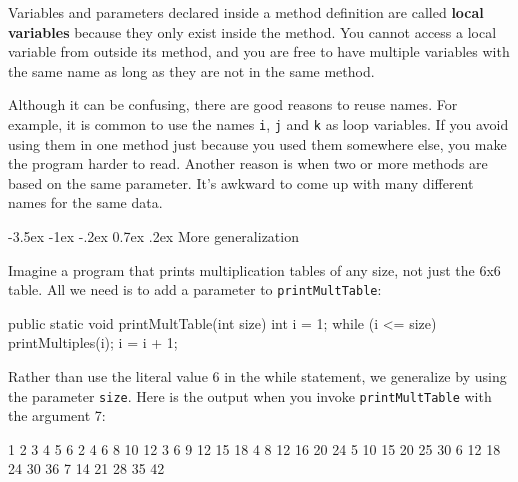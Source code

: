 \documentclass[12pt]{book}
\makeatletter
\theoremstyle{exercise}
\newcommand{\java}[1]{\verb"#1"}
\renewcommand{\section}{\@startsection{section}{1}{\z@}%
    {-3.5ex \@plus -1ex \@minus -.2ex}%
    {0.7ex \@plus.2ex}%
    {\normalfont\Large\bfseries}}
\newcommand{\java}[1]{\lstinline{#1}} %
\makeatother
\begin{document}


Variables and parameters declared inside a method definition are called {\bf local variables} because they only exist inside the method.
You cannot access a local variable from outside its method, and you are free to have multiple variables with the same name as long as they are not in the same method.


Although it can be confusing, there are good reasons to reuse names.
For example, it is common to use the names \java{i}, \java{j} and \java{k} as loop variables.
If you avoid using them in one method just because you used them somewhere else, you make the program harder to read.
Another reason is when two or more methods are based on the same parameter.
It's awkward to come up with many different names for the same data.


\section{More generalization}

Imagine a program that prints multiplication tables of any size, not just the 6x6 table.
All we need is to add a parameter to \java{printMultTable}:

\begin{code}
    public static void printMultTable(int size) {
        int i = 1;
        while (i <= size) {
            printMultiples(i);
            i = i + 1;
        }
    }
\end{code}

Rather than use the literal value 6 in the while statement, we generalize by using the parameter \java{size}.
Here is the output when you invoke \java{printMultTable} with the argument 7:

\begin{stdout}
   1   2   3   4   5   6
   2   4   6   8  10  12
   3   6   9  12  15  18
   4   8  12  16  20  24
   5  10  15  20  25  30
   6  12  18  24  30  36
   7  14  21  28  35  42
\end{stdout}
\end{document}
